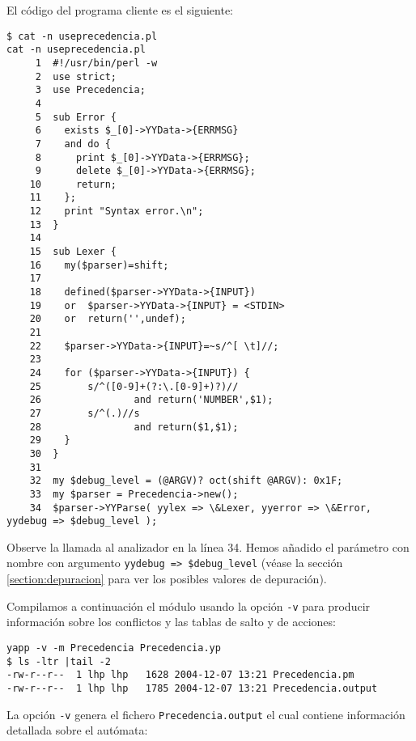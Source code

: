 El código del programa cliente es el siguiente:

\begin{verbatim}
$ cat -n useprecedencia.pl
cat -n useprecedencia.pl
     1  #!/usr/bin/perl -w
     2  use strict;
     3  use Precedencia;
     4
     5  sub Error {
     6    exists $_[0]->YYData->{ERRMSG}
     7    and do {
     8      print $_[0]->YYData->{ERRMSG};
     9      delete $_[0]->YYData->{ERRMSG};
    10      return;
    11    };
    12    print "Syntax error.\n";
    13  }
    14
    15  sub Lexer {
    16    my($parser)=shift;
    17
    18    defined($parser->YYData->{INPUT})
    19    or  $parser->YYData->{INPUT} = <STDIN>
    20    or  return('',undef);
    21
    22    $parser->YYData->{INPUT}=~s/^[ \t]//;
    23
    24    for ($parser->YYData->{INPUT}) {
    25        s/^([0-9]+(?:\.[0-9]+)?)//
    26                and return('NUMBER',$1);
    27        s/^(.)//s
    28                and return($1,$1);
    29    }
    30  }
    31
    32  my $debug_level = (@ARGV)? oct(shift @ARGV): 0x1F;
    33  my $parser = Precedencia->new();
    34  $parser->YYParse( yylex => \&Lexer, yyerror => \&Error, yydebug => $debug_level );
\end{verbatim}

Observe la llamada al analizador en la línea 34. Hemos 
añadido el parámetro con nombre  
con argumento \verb|yydebug => $debug_level| (véase la
sección \ref{section:depuracion} para ver los posibles
valores de depuración).

Compilamos a continuación el módulo usando la opción \verb|-v| para
producir información sobre los conflictos y las tablas de salto y 
de acciones:
\begin{verbatim}
yapp -v -m Precedencia Precedencia.yp
$ ls -ltr |tail -2
-rw-r--r--  1 lhp lhp   1628 2004-12-07 13:21 Precedencia.pm
-rw-r--r--  1 lhp lhp   1785 2004-12-07 13:21 Precedencia.output
\end{verbatim}

La opción \verb|-v| genera el fichero \verb|Precedencia.output|
el cual contiene información detallada sobre el autómata:

